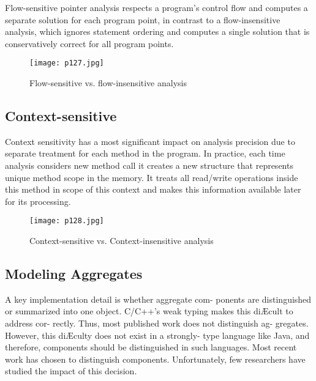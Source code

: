 Flow-sensitive pointer analysis respects a program’s control flow
and computes a separate solution for each program point, in contrast to a flow-insensitive analysis, 
which ignores statement ordering and computes a single solution that is conservatively correct for
all program points.


\begin{figure}[H]
	\centering
	\texttt{[image: p127.jpg]}
	\caption{Flow-sensitive vs. flow-insensitive analysis}
	\label{fig:p127}
\end{figure}


\subsection{Context-sensitive }


Context sensitivity has a most significant impact on analysis precision due to separate
treatment for each method in the program. In practice, each time analysis considers new
method call it creates a new structure that represents unique method scope in the memory.
It treats all read/write operations inside this method in scope of this context and makes this
information available later for its processing.


\begin{figure}[H]
	\centering
	\texttt{[image: p128.jpg]}
	\caption{Context-sensitive vs. Context-insensitive analysis}
	\label{fig:p128}
\end{figure}



\subsection{Modeling Aggregates}
A key implementation detail is whether aggregate com-
ponents are distinguished or summarized into one object.
C/C++'s weak typing makes this diÆcult to address cor-
rectly. Thus, most published work does not distinguish ag-
gregates. However, this diÆculty does not exist in a strongly-
type language like Java, and therefore, components should
be distinguished in such languages. Most recent work
has chosen to distinguish components. Unfortunately, few researchers have studied the impact of this decision.